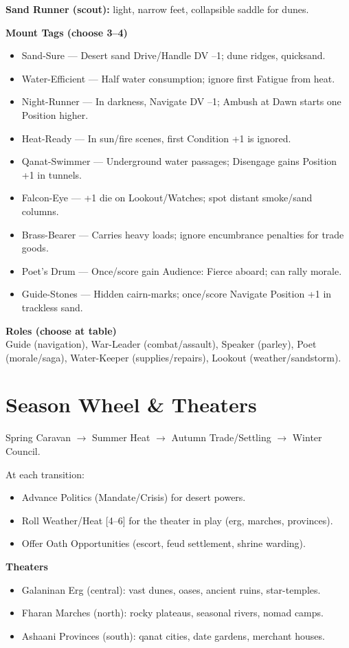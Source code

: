 \documentclass[11pt]{article}
\begin{document}
\textbf{Sand Runner (scout):} light, narrow feet, collapsible saddle for dunes.

\textbf{Mount Tags (choose 3--4)}
\begin{itemize}
\item Sand-Sure --- Desert sand Drive/Handle DV --1; dune ridges, quicksand.
\item Water-Efficient --- Half water consumption; ignore first Fatigue from heat.
\item Night-Runner --- In darkness, Navigate DV --1; Ambush at Dawn starts one Position higher.
\item Heat-Ready --- In sun/fire scenes, first Condition +1 is ignored.
\item Qanat-Swimmer --- Underground water passages; Disengage gains Position +1 in tunnels.
\item Falcon-Eye --- +1 die on Lookout/Watches; spot distant smoke/sand columns.
\item Brass-Bearer --- Carries heavy loads; ignore encumbrance penalties for trade goods.
\item Poet's Drum --- Once/score gain Audience: Fierce aboard; can rally morale.
\item Guide-Stones --- Hidden cairn-marks; once/score Navigate Position +1 in trackless sand.
\end{itemize}

\textbf{Roles (choose at table)}\\
Guide (navigation), War-Leader (combat/assault), Speaker (parley), Poet (morale/saga), Water-Keeper (supplies/repairs), Lookout (weather/sandstorm).

\section{Season Wheel \& Theaters}

Spring Caravan $\rightarrow$ Summer Heat $\rightarrow$ Autumn Trade/Settling $\rightarrow$ Winter Council.

At each transition:
\begin{itemize}
\item Advance Politics (Mandate/Crisis) for desert powers.
\item Roll Weather/Heat [4--6] for the theater in play (erg, marches, provinces).
\item Offer Oath Opportunities (escort, feud settlement, shrine warding).
\end{itemize}

\textbf{Theaters}
\begin{itemize}
\item Galaninan Erg (central): vast dunes, oases, ancient ruins, star-temples.
\item Fharan Marches (north): rocky plateaus, seasonal rivers, nomad camps.
\item Ashaani Provinces (south): qanat cities, date gardens, merchant houses.
\end{itemize}
\end{document}
